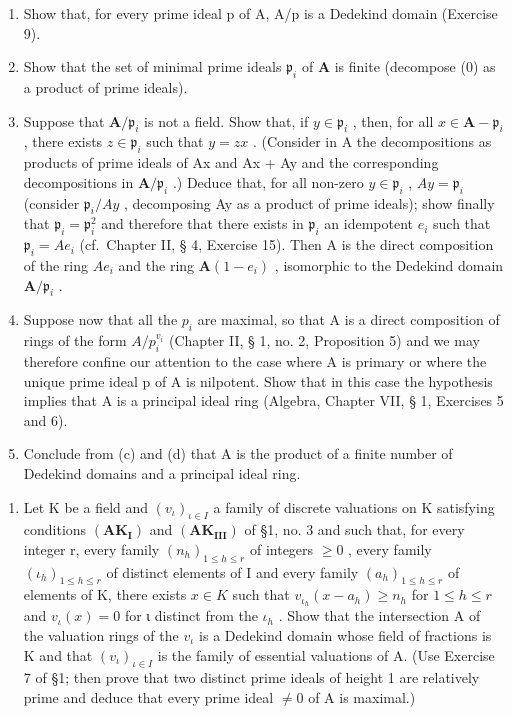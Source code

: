 \begin{enumerate}
\def\labelenumi{(\alph{enumi})}
\item
  Show that, for every prime ideal p of A, A/p is a Dedekind domain (Exercise 9).
\item
  Show that the set of minimal prime ideals \(\mathfrak{p}_i\) of \(\mathbf{A}\) is finite (decompose (0) as a product of prime ideals).
\item
  Suppose that \(\mathbf{A} / \mathfrak{p}_i\) is not a field. Show that, if \(y \in \mathfrak{p}_i\) , then, for all \(x \in \mathbf{A} - \mathfrak{p}_i\) , there exists \(z \in \mathfrak{p}_i\) such that \(y = zx\) . (Consider in A the decompositions as products of prime ideals of Ax and Ax + Ay and the corresponding decompositions in \(\mathbf{A} / \mathfrak{p}_i\) .) Deduce that, for all non-zero \(y \in \mathfrak{p}_i\) , \(Ay = \mathfrak{p}_i\) (consider \(\mathfrak{p}_i / Ay\) , decomposing Ay as a product of prime ideals); show finally that \(\mathfrak{p}_i = \mathfrak{p}_i^2\) and therefore that there exists in \(\mathfrak{p}_i\) an idempotent \(e_i\) such that \(\mathfrak{p}_i = Ae_i\) (cf.~Chapter II, § 4, Exercise 15). Then A is the direct composition of the ring \(Ae_i\) and the ring \(\mathbf{A}(1 - e_i)\) , isomorphic to the Dedekind domain \(\mathbf{A} / \mathfrak{p}_i\) .
\item
  Suppose now that all the \(p_{i}\) are maximal, so that A is a direct composition of rings of the form \(A/p_{i}^{v_{i}}\) (Chapter II, § 1, no. 2, Proposition 5) and we may therefore confine our attention to the case where A is primary or where the unique prime ideal p of A is nilpotent. Show that in this case the hypothesis implies that A is a principal ideal ring (Algebra, Chapter VII, § 1, Exercises 5 and 6).
\item
  Conclude from (c) and (d) that A is the product of a finite number of Dedekind domains and a principal ideal ring.
\end{enumerate}

\begin{enumerate}
\def\labelenumi{\arabic{enumi}.}
\setcounter{enumi}{10}
\tightlist
\item
  Let K be a field and \((v_{\iota})_{\iota\in I}\) a family of discrete valuations on K satisfying conditions \((\mathbf{AK}_{\mathbf{I}})\) and \((\mathbf{AK}_{\mathbf{III}})\) of §1, no. 3 and such that, for every integer r, every family \((n_{h})_{1\leqslant h\leqslant r}\) of integers \(\geqslant0\) , every family \((\iota_{h})_{1\leqslant h\leqslant r}\) of distinct elements of I and every family \((a_{h})_{1\leqslant h\leqslant r}\) of elements of K, there exists \(x\in K\) such that \(v_{\iota_{h}}(x-a_{h})\geqslant n_{h}\) for \(1\leqslant h\leqslant r\) and \(v_{\iota}(x)=0\) for ι distinct from the \(\iota_{h}\) . Show that the intersection A of the valuation rings of the \(v_{\iota}\) is a Dedekind domain whose field of fractions is K and that \((v_{\iota})_{\iota\in I}\) is the family of essential valuations of A. (Use Exercise 7 of §1; then prove that two distinct prime ideals of height 1 are relatively prime and deduce that every prime ideal \(\neq0\) of A is maximal.)
\end{enumerate}

